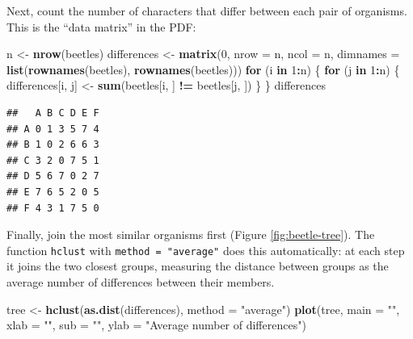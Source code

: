 \documentclass[
  a4paper]{book}
\newenvironment{Shaded}{\begin{snugshade}}{\end{snugshade}}
\newcommand{\AttributeTok}[1]{\textcolor[rgb]{0.13,0.29,0.53}{#1}}
\newcommand{\ControlFlowTok}[1]{\textcolor[rgb]{0.13,0.29,0.53}{\textbf{#1}}}
\newcommand{\DecValTok}[1]{\textcolor[rgb]{0.00,0.00,0.81}{#1}}
\newcommand{\FunctionTok}[1]{\textcolor[rgb]{0.13,0.29,0.53}{\textbf{#1}}}
\newcommand{\NormalTok}[1]{#1}
\newcommand{\OtherTok}[1]{\textcolor[rgb]{0.56,0.35,0.01}{#1}}
\newcommand{\SpecialCharTok}[1]{\textcolor[rgb]{0.81,0.36,0.00}{\textbf{#1}}}
\newcommand{\StringTok}[1]{\textcolor[rgb]{0.31,0.60,0.02}{#1}}
\begin{document}
Next, count the number of characters that differ between each pair of organisms. This is the ``data matrix'' in the PDF:

\begin{Shaded}
\begin{Highlighting}[]
\NormalTok{n }\OtherTok{\textless{}{-}} \FunctionTok{nrow}\NormalTok{(beetles)}
\NormalTok{differences }\OtherTok{\textless{}{-}} \FunctionTok{matrix}\NormalTok{(}\DecValTok{0}\NormalTok{, }\AttributeTok{nrow =}\NormalTok{ n, }\AttributeTok{ncol =}\NormalTok{ n,}
                      \AttributeTok{dimnames =} \FunctionTok{list}\NormalTok{(}\FunctionTok{rownames}\NormalTok{(beetles), }\FunctionTok{rownames}\NormalTok{(beetles)))}
\ControlFlowTok{for}\NormalTok{ (i }\ControlFlowTok{in} \DecValTok{1}\SpecialCharTok{:}\NormalTok{n) \{}
  \ControlFlowTok{for}\NormalTok{ (j }\ControlFlowTok{in} \DecValTok{1}\SpecialCharTok{:}\NormalTok{n) \{}
\NormalTok{    differences[i, j] }\OtherTok{\textless{}{-}} \FunctionTok{sum}\NormalTok{(beetles[i, ] }\SpecialCharTok{!=}\NormalTok{ beetles[j, ])}
\NormalTok{  \}}
\NormalTok{\}}
\NormalTok{differences}
\end{Highlighting}
\end{Shaded}

\begin{verbatim}
##   A B C D E F
## A 0 1 3 5 7 4
## B 1 0 2 6 6 3
## C 3 2 0 7 5 1
## D 5 6 7 0 2 7
## E 7 6 5 2 0 5
## F 4 3 1 7 5 0
\end{verbatim}

Finally, join the most similar organisms first (Figure \ref{fig:beetle-tree}). The function \texttt{hclust} with \texttt{method\ =\ "average"} does this automatically: at each step it joins the two closest groups, measuring the distance between groups as the average number of differences between their members.

\begin{Shaded}
\begin{Highlighting}[]
\NormalTok{tree }\OtherTok{\textless{}{-}} \FunctionTok{hclust}\NormalTok{(}\FunctionTok{as.dist}\NormalTok{(differences), }\AttributeTok{method =} \StringTok{"average"}\NormalTok{)}
\FunctionTok{plot}\NormalTok{(tree, }\AttributeTok{main =} \StringTok{""}\NormalTok{, }\AttributeTok{xlab =} \StringTok{""}\NormalTok{, }\AttributeTok{sub =} \StringTok{""}\NormalTok{,}
     \AttributeTok{ylab =} \StringTok{"Average number of differences"}\NormalTok{)}
\end{Highlighting}
\end{Shaded}
\end{document}
